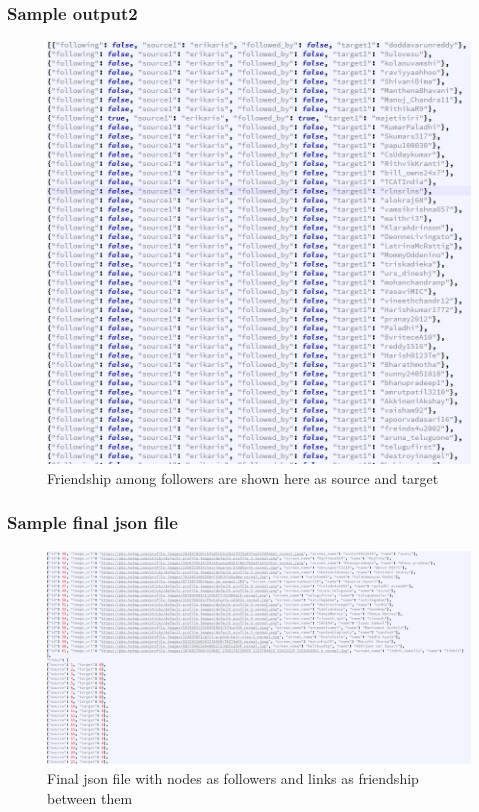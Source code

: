 \subsubsection{Sample output2}
\begin{figure}[ht]    
    \begin{center}
        \includegraphics[scale=0.7]{sample_f2.png}
        \caption{Friendship among followers are shown here as source and target}
        \label{Sample_list3}
    \end{center}
\end{figure}
\newpage

\subsubsection{Sample final json file}
\begin{figure}[ht]    
    \begin{center}
        \includegraphics[scale=0.7]{sample_followers_json.png}
        \caption{Final json file with nodes as followers and links as friendship between them}
        \label{Sample_list4}
    \end{center}
\end{figure}
\newpage
